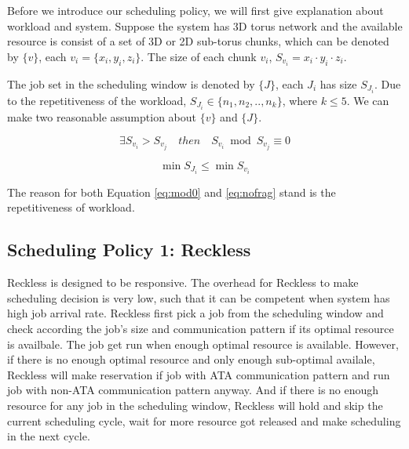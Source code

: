 \documentclass[conference]{IEEEtran}
\begin{document}
Before we introduce our scheduling policy, we will first give explanation about workload and system. Suppose the system has 3D torus network and the available resource is consist of a set of 3D or 2D sub-torus chunks, which can be denoted by $\{v\}$, each $v_i = \{x_i, y_i, z_i\}$. The size of each chunk $v_i$, $S_{v_i} = x_i\cdot y_i\cdot z_i $. 

The job set in the scheduling window is denoted by $\{J\}$, each $J_i$ has size $S_{J_i}$. Due to the repetitiveness of the workload, $S_{J_i} \in \{n_1, n_2, .., n_k\}$, where $k \leq 5$. 
We can make two reasonable assumption about $\{v\}$ and $\{J\}$. 

\begin{equation}
\label{eq:mod0}
\exists S_{v_i} > S_{v_j} \quad then\quad S_{v_i} \bmod S_{v_j} \equiv 0
\end{equation}


\begin{equation}
\label{eq:nofrag}
\min S_{J_i} \leq \min S_{v_i} 
\end{equation}

The reason for both Equation \ref{eq:mod0} and \ref{eq:nofrag} stand is the repetitiveness of workload.

\subsection{Scheduling Policy 1: Reckless}
\label{sec:reckless}

Reckless is designed to be responsive. The overhead for Reckless to make scheduling decision is very low, such that it can be competent when system has high job arrival rate. Reckless first pick a job from the scheduling window and check according the job's size and communication pattern if its optimal resource is availbale. The job get run when enough optimal resource is available. However, if there is no enough optimal resource and only enough sub-optimal availale, Reckless will make reservation if job with ATA communication pattern and run job with non-ATA communication pattern anyway. And if there is no enough resource for any job in the scheduling window, Reckless will hold and skip the current scheduling cycle, wait for more resource got released and make scheduling in the next cycle.
\end{document}
